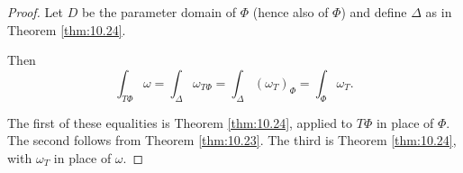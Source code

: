 \begin{proof}
    Let $D$ be the parameter domain of $\Phi$ (hence also of $\Phi$) and define $\Delta$ as in Theorem \ref{thm:10.24}.

    Then
    \begin{equation*}
        \int_{T \Phi} \omega =
        \int_{\Delta} \omega_{T \Phi} =
        \int_{\Delta} (\omega_{T})_{\Phi} =
        \int_{\Phi} \omega_{T} .
    \end{equation*}

    The first of these equalities is Theorem \ref{thm:10.24}, applied to $T\Phi$ in place of $\Phi$.
    The second follows from Theorem \ref{thm:10.23}. The third is Theorem \ref{thm:10.24},
    with $\omega_T$ in place of $\omega$.
\end{proof}